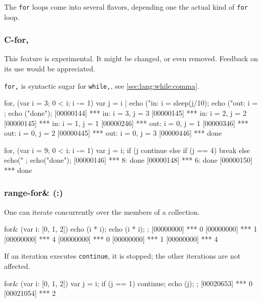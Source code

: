 The \lstinline|for| loops come into several flavors, depending one the
actual kind of \lstinline|for| loop.

\subsubsection{C-for,}
\begin{note}
  This feature is experimental.  It might be changed, or even removed.
  Feedback on its use would be appreciated.
\end{note}

\lstinline|for,| is syntactic sugar for \lstinline|while,|, see
\autoref{sec:lang:while:comma}.

\begin{urbiscript}[firstnumber=last]
for, (var i = 3; 0 < i; i -= 1)
{
  var j = i |
  echo ("in: i = %
  sleep(j/10);
  echo ("out: i = %
};
echo ("done");
[00000144] *** in: i = 3, j = 3
[00000145] *** in: i = 2, j = 2
[00000145] *** in: i = 1, j = 1
[00000246] *** out: i = 0, j = 1
[00000346] *** out: i = 0, j = 2
[00000445] *** out: i = 0, j = 3
[00000446] *** done
\end{urbiscript}

\begin{urbiscript}[firstnumber=last]
for, (var i = 9; 0 < i; i -= 1)
{
  var j = i;
  if (j %
    continue
  else if (j == 4)
    break
  else
    echo("%
};
echo("done");
[00000146] *** 8: done
[00000148] *** 6: done
[00000150] *** done
\end{urbiscript}


\subsubsection{range-for\& (:)}
\label{sec:lang:for:each:and}

One can iterate concurrently over the members of a collection.

\begin{urbiscript}[firstnumber=last]
for& (var i: [0, 1, 2])
{
  echo (i * i);
  echo (i * i);
};
[00000000] *** 0
[00000000] *** 1
[00000000] *** 4
[00000000] *** 0
[00000000] *** 1
[00000000] *** 4
\end{urbiscript}

If an iteration executes \lstinline|continue|, it is stopped; the
other iterations are not affected.

\begin{urbiscript}[firstnumber=last]
for& (var i: [0, 1, 2])
{
  var j = i;
  if (j == 1)
    continue;
  echo (j);
};
[00020653] *** 0
[00021054] *** 2
\end{urbiscript}

